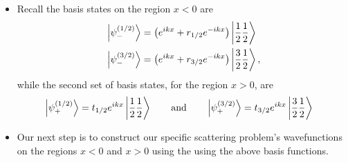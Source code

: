 \documentclass[11pt, a4paper]{article}
\newcommand{\eqtext}[1]{\qquad \text{#1} \qquad}
\begin{document}
\begin{itemize}
	\item Recall the basis states on the region $ x < 0 $ are
	\begin{align*}
		&\ket{\psi_{-}^{(1/2)}} = \left(e^{ikx} + r_{1/2}e^{-ikx}\right)\ket{\frac{1}{2}\frac{1}{2}}\\
		& \ket{\psi_{-}^{(3/2)}} = \left(e^{ikx} + r_{3/2}e^{-ikx}\right)\ket{\frac{3}{2}\frac{1}{2}},
	\end{align*}
	while the second set of basis states, for the region $ x > 0 $, are
	\begin{align*}
		&\ket{\psi_{+}^{(1/2)}} =  t_{1/2}e^{ikx}\ket{\frac{1}{2}\frac{1}{2}} \eqtext{and}\ket{\psi_{+}^{(3/2)}} = t_{3/2}e^{ikx}\ket{\frac{3}{2}\frac{1}{2}}
	\end{align*}
	
	\item Our next step is to construct our specific scattering problem's wavefunctions on the regions $ x < 0 $ and $ x > 0 $ using the using the above basis functions. 
	

\end{itemize}
\end{document}
